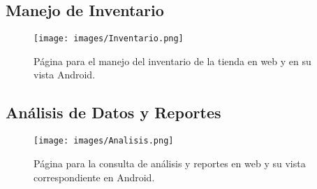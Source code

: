 \subsection{Manejo de Inventario}

\begin{figure}[H]
    \texttt{[image: images/Inventario.png]}
    \centering
    \caption{Página para el manejo del inventario de la tienda en web y en su vista Android.}
\end{figure}

\subsection{Análisis de Datos y Reportes}

\begin{figure}[H]
    \texttt{[image: images/Analisis.png]}
    \centering
    \caption{Página para la consulta de análisis y reportes en web y su vista correspondiente en Android.}
\end{figure}
